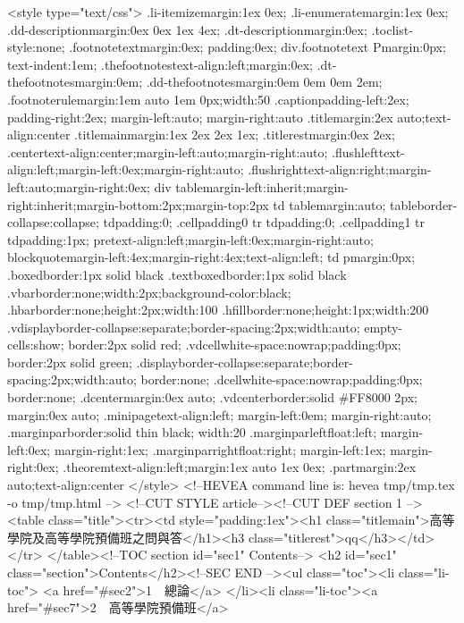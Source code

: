 <style type="text/css">
.li-itemize{margin:1ex 0ex;}
.li-enumerate{margin:1ex 0ex;}
.dd-description{margin:0ex 0ex 1ex 4ex;}
.dt-description{margin:0ex;}
.toc{list-style:none;}
.footnotetext{margin:0ex; padding:0ex;}
div.footnotetext P{margin:0px; text-indent:1em;}
.thefootnotes{text-align:left;margin:0ex;}
.dt-thefootnotes{margin:0em;}
.dd-thefootnotes{margin:0em 0em 0em 2em;}
.footnoterule{margin:1em auto 1em 0px;width:50%
.caption{padding-left:2ex; padding-right:2ex; margin-left:auto; margin-right:auto}
.title{margin:2ex auto;text-align:center}
.titlemain{margin:1ex 2ex 2ex 1ex;}
.titlerest{margin:0ex 2ex;}
.center{text-align:center;margin-left:auto;margin-right:auto;}
.flushleft{text-align:left;margin-left:0ex;margin-right:auto;}
.flushright{text-align:right;margin-left:auto;margin-right:0ex;}
div table{margin-left:inherit;margin-right:inherit;margin-bottom:2px;margin-top:2px}
td table{margin:auto;}
table{border-collapse:collapse;}
td{padding:0;}
.cellpadding0 tr td{padding:0;}
.cellpadding1 tr td{padding:1px;}
pre{text-align:left;margin-left:0ex;margin-right:auto;}
blockquote{margin-left:4ex;margin-right:4ex;text-align:left;}
td p{margin:0px;}
.boxed{border:1px solid black}
.textboxed{border:1px solid black}
.vbar{border:none;width:2px;background-color:black;}
.hbar{border:none;height:2px;width:100%
.hfill{border:none;height:1px;width:200%
.vdisplay{border-collapse:separate;border-spacing:2px;width:auto; empty-cells:show; border:2px solid red;}
.vdcell{white-space:nowrap;padding:0px; border:2px solid green;}
.display{border-collapse:separate;border-spacing:2px;width:auto; border:none;}
.dcell{white-space:nowrap;padding:0px; border:none;}
.dcenter{margin:0ex auto;}
.vdcenter{border:solid #FF8000 2px; margin:0ex auto;}
.minipage{text-align:left; margin-left:0em; margin-right:auto;}
.marginpar{border:solid thin black; width:20%
.marginparleft{float:left; margin-left:0ex; margin-right:1ex;}
.marginparright{float:right; margin-left:1ex; margin-right:0ex;}
.theorem{text-align:left;margin:1ex auto 1ex 0ex;}
.part{margin:2ex auto;text-align:center}
</style>
<!--HEVEA command line is: hevea tmp/tmp.tex -o tmp/tmp.html -->
<!--CUT STYLE article--><!--CUT DEF section 1 --><table class="title"><tr><td style="padding:1ex"><h1 class="titlemain">高等學院及高等學院預備班之問與答</h1><h3 class="titlerest">qq</h3></td></tr>
</table><!--TOC section id="sec1" Contents-->
<h2 id="sec1" class="section">Contents</h2><!--SEC END --><ul class="toc"><li class="li-toc">
<a href="#sec2">1  總論</a>
</li><li class="li-toc"><a href="#sec7">2  高等學院預備班</a>
}}}}
